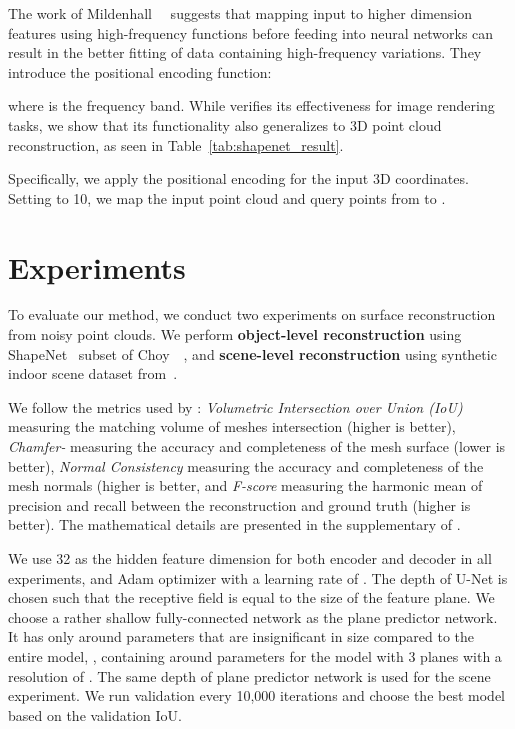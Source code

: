 \documentclass[10pt,twocolumn,letterpaper]{article}
\newcommand{\boldparagraph}[1]{\vspace{0.2cm}\noindent{\bf #1:} }
\begin{document}
The work of Mildenhall~\etal~\cite{mildenhall2020nerf} suggests that mapping input to higher dimension features using high-frequency functions before feeding into neural networks can result in the better fitting of data containing high-frequency variations. They introduce the positional encoding function:

where  is the frequency band. While \cite{mildenhall2020nerf} verifies its effectiveness for image rendering tasks, we show that its functionality also generalizes to 3D point cloud reconstruction, as seen in Table~\ref{tab:shapenet_result}.

Specifically, we apply the positional encoding for the input 3D coordinates. Setting  to 10, we map the input point cloud  and query points  from  to .

\section{Experiments}

To evaluate our method, we conduct two experiments on surface reconstruction from noisy point clouds. We perform \textbf{object-level reconstruction} using ShapeNet~\cite{chang2015shapenet} subset of Choy~\etal~\cite{choy20163d}, and \textbf{scene-level reconstruction} using synthetic indoor scene dataset from~\cite{peng2020convolutional}. 

\boldparagraph{Metrics} We follow the metrics used by \cite{peng2020convolutional}: \emph{Volumetric Intersection over Union (IoU)} measuring the matching volume of meshes intersection (higher is better), \emph{Chamfer-} measuring the accuracy and completeness of the mesh surface (lower is better), \emph{Normal Consistency} measuring the accuracy and completeness of the mesh normals (higher is better, and \emph{F-score} measuring the harmonic mean of precision and recall between the reconstruction and ground truth (higher is better). The mathematical details are presented in the supplementary of \cite{peng2020convolutional}.

\boldparagraph{Implementation details} We use 32 as the hidden feature dimension for both encoder and decoder in all experiments, and Adam optimizer with a learning rate of . The depth of U-Net is chosen such that the receptive field
is equal to the size of the feature plane.
We choose a rather shallow fully-connected network as the plane predictor network. It has only around  parameters that are insignificant in size compared to the entire model, \eg, containing around  parameters for the model with 3 planes with a resolution of . The same depth of plane predictor network is used for the scene experiment. We run validation every 10,000 iterations and choose the best model based on the validation IoU.
\end{document}
